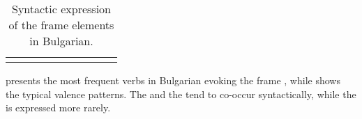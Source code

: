 \documentclass[output=paper,colorlinks,citecolor=brown]{langscibook}
\begin{document}
\begin{table}
\begin{tabular}{l rrrrrrrrr}
\lspbottomrule
 \end{tabular}
 \caption{Syntactic expression of the  frame elements in Bulgarian. } 
    \label{tbl:telling-synt-bg}
 \end{table}

 presents the most frequent verbs in Bulgarian evoking the frame , while
 shows the typical valence patterns. The  and the  tend to co-occur syntactically, while the  is expressed more rarely.
\end{document}
